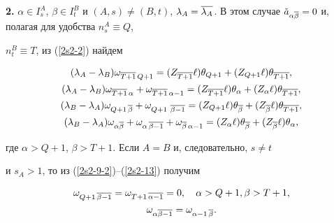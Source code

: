 {\bf 2.} $\alpha \in I^A_s$, $\beta \in I^B_t$ и $(A,s) \neq


(B,t)$, $\lambda_A = \ol{\lambda_A}$. В этом случае $\Check


a_{\alpha\ol\beta} = 0$ и, полагая для удобства $n^{A}_s \equiv Q$,


$n^B_t \equiv T$, из (\ref{2s2-2}) найдем


\begin{gather}


\label{2s2-10-2}


(\lambda_A - \lambda_B)\omega_{\ol{T+1}\, Q+1} =


(Z_{\ol{T+1}}\ell) \theta_{Q+1} + (Z_{Q+1} \ell) \theta_{\ol{T+1}},\\


%


\label{2s2-11-2}


(\lambda_A - \lambda_B) \omega_{\ol{T+1}\, \alpha} +


\omega_{\ol{T+1}\, \alpha-1} =


(Z_{\ol{T+1}}\ell) \theta_\alpha + (Z_{\alpha} \ell) \theta_{\ol{T+1}},\\


%


\label{2s2-12}


(\lambda_B - \lambda_A) \omega_{Q+1\, \ol\beta} + \omega_{Q+1\


\ol{\beta-1}} = (Z_{Q+1} \ell) \theta_{\ol\beta} +


(Z_{\ol\beta}\ell)\theta_{\ol{T+1}},\\


%


\label{2s2-13}


(\lambda_B - \lambda_A) \omega_{\alpha\ol\beta}+


\omega_{\alpha\, \ol{\beta-1}} +\omega_{\ol\beta\, \alpha-1} =


(Z_{\alpha}\ell)\theta_{\ol\beta} + (Z_{\ol\beta}\ell)\theta_{\alpha},


\end{gather}


где $\alpha > Q+1$, $\beta >T+1$. Если $A=B$ и, следовательно, $s\neq t$


и $s_A>1$, то из (\ref{2s2-9-2})--(\ref{2s2-13}) получим


\begin{gather}


\label{2s2-14}


\omega_{Q +1\, \ol{\beta -1}} = \omega_{T +1\, \ol{\alpha -1}} = 0,


\quad \alpha > Q+1, \beta > T+1,\\


%


\label{2s2-15}


\omega_{\alpha \ol{\beta -1}} = \omega_{\alpha-1\, \ol\beta}.


\end{gather}


